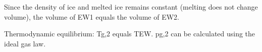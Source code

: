 Since the density of ice and melted ice remains constant (melting does not change volume), the volume of EW1 equals the volume of EW2.  

Thermodynamic equilibrium:  
Tg,2 equals TEW.  
pg,2 can be calculated using the ideal gas law.